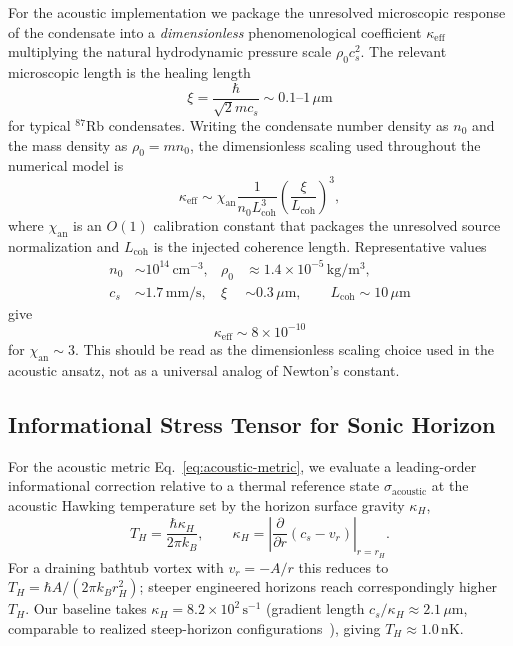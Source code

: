 \documentclass[aps,prd,twocolumn,superscriptaddress,nofootinbib,floatfix]{revtex4-2}
\begin{document}
For the acoustic implementation we package the unresolved microscopic response of the condensate into a \emph{dimensionless} phenomenological coefficient $\kappa_{\mathrm{eff}}$ multiplying the natural hydrodynamic pressure scale $\rho_0 c_s^2$. The relevant microscopic length is the healing length
\begin{equation}
    \xi = \frac{\hbar}{\sqrt{2} m c_s} \sim 0.1\text{--}1\,\mu\mathrm{m}
\end{equation}
for typical $^{87}$Rb condensates. Writing the condensate number density as $n_0$ and the mass density as $\rho_0 = m n_0$, the dimensionless scaling used throughout the numerical model is
\begin{equation}
    \kappa_{\mathrm{eff}} \sim \chi_{\mathrm{an}}
    \frac{1}{n_0 L_{\mathrm{coh}}^3}
    \left(\frac{\xi}{L_{\mathrm{coh}}}\right)^3,
\end{equation}
where $\chi_{\mathrm{an}}$ is an $O(1)$ calibration constant that packages the unresolved source normalization and $L_{\mathrm{coh}}$ is the injected coherence length. Representative values
\begin{align}
    n_0 &\sim 10^{14}\,\mathrm{cm}^{-3}, &
    \rho_0 &\approx 1.4 \times 10^{-5}\,\mathrm{kg/m^3}, \\
    c_s &\sim 1.7\,\mathrm{mm/s}, &
    \xi &\sim 0.3\,\mu\mathrm{m}, \qquad
    L_{\mathrm{coh}} \sim 10\,\mu\mathrm{m}
\end{align}
give
\begin{equation}
    \boxed{\kappa_{\mathrm{eff}} \sim 8\times 10^{-10}}
    \label{eq:kappa-analog}
\end{equation}
for $\chi_{\mathrm{an}} \sim 3$. This should be read as the dimensionless scaling choice used in the acoustic ansatz, not as a universal analog of Newton's constant.

\subsection{Informational Stress Tensor for Sonic Horizon}

For the acoustic metric Eq.~\eqref{eq:acoustic-metric}, we evaluate a leading-order informational correction relative to a thermal reference state $\sigma_{\mathrm{acoustic}}$ at the acoustic Hawking temperature set by the horizon surface gravity $\kappa_H$,
\begin{equation}
    T_H = \frac{\hbar \kappa_H}{2\pi k_B},
    \qquad
    \kappa_H = \left| \frac{\partial}{\partial r}(c_s - v_r) \right|_{r = r_H}.
\end{equation}
For a draining bathtub vortex with $v_r = -A/r$ this reduces to $T_H = \hbar A/(2\pi k_B r_H^2)$; steeper engineered horizons reach correspondingly higher $T_H$. Our baseline takes $\kappa_H = 8.2\times10^{2}\,\mathrm{s^{-1}}$ (gradient length $c_s/\kappa_H \approx 2.1\,\mu\mathrm{m}$, comparable to realized steep-horizon configurations~\cite{Steinhauer2016}), giving $T_H \approx 1.0\,\mathrm{nK}$.
\end{document}

